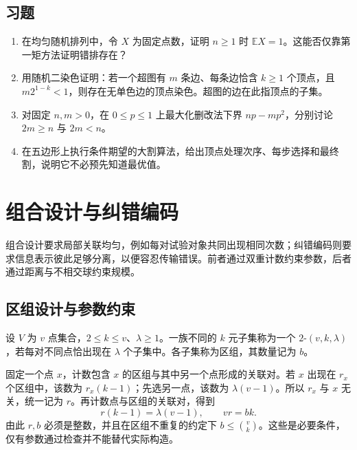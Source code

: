 \documentclass[UTF8,12pt,a4paper,fontset=fandol]{ctexbook}
\begin{document}
\section{习题}
\begin{enumerate}
  \item\label{ex:probabilistic-1} 在均匀随机排列中，令 $X$ 为固定点数，证明 $n\ge1$ 时 $\mathbb E X=1$。这能否仅靠第一矩方法证明错排存在？
  \item\label{ex:probabilistic-2} 用随机二染色证明：若一个超图有 $m$ 条边、每条边恰含 $k\ge1$ 个顶点，且 $m2^{1-k}<1$，则存在无单色边的顶点染色。超图的边在此指顶点的子集。
  \item\label{ex:probabilistic-3} 对固定 $n,m>0$，在 $0\le p\le1$ 上最大化删改法下界 $np-mp^2$，分别讨论 $2m\ge n$ 与 $2m<n$。
  \item\label{ex:probabilistic-4} 在五边形上执行条件期望的大割算法，给出顶点处理次序、每步选择和最终割，说明它不必预先知道最优值。
\end{enumerate}

\chapter{组合设计与纠错编码}
\label{ch:designs-codes}

组合设计要求局部关联均匀，例如每对试验对象共同出现相同次数；纠错编码则要求信息表示彼此足够分离，以便容忍传输错误。前者通过双重计数约束参数，后者通过距离与不相交球约束规模。

\section{区组设计与参数约束}

\begin{definition}
设 $V$ 为 $v$ 点集合，$2\le k\le v$、$\lambda\ge1$。一族不同的 $k$ 元子集称为一个 $2$-$(v,k,\lambda)$ ，若每对不同点恰出现在 $\lambda$ 个子集中。各子集称为区组，其数量记为 $b$。
\end{definition}

固定一个点 $x$，计数包含 $x$ 的区组与其中另一个点形成的关联对。若 $x$ 出现在 $r_x$ 个区组中，该数为 $r_x(k-1)$；先选另一点，该数为 $\lambda(v-1)$。所以 $r_x$ 与 $x$ 无关，统一记为 $r$。再计数点与区组的关联对，得到
\begin{equation}
 r(k-1)=\lambda(v-1),\qquad vr=bk.
 \label{eq:design-parameters}
\end{equation}
由此 $r,b$ 必须是整数，并且在区组不重复的约定下 $b\le\binom vk$。这些是必要条件，仅有参数通过检查并不能替代实际构造。
\end{document}
